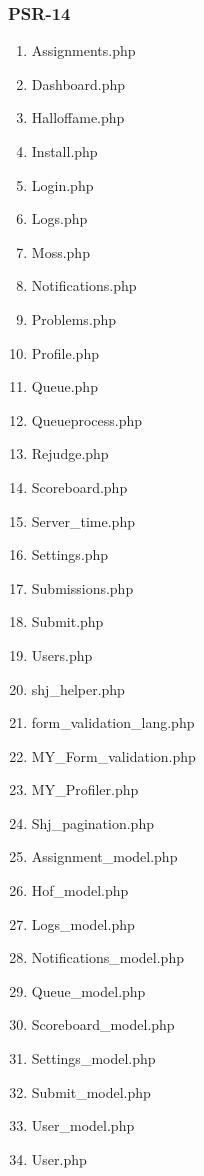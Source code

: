 \subsubsection{PSR-14}
\begin{enumerate}
	\item Assignments.php
	\item Dashboard.php
	\item Halloffame.php
	\item Install.php
	\item Login.php
	\item Logs.php
	\item Moss.php
	\item Notifications.php
	\item Problems.php
	\item Profile.php
	\item Queue.php
	\item Queueprocess.php
	\item Rejudge.php
	\item Scoreboard.php
	\item Server\_time.php
	\item Settings.php
	\item Submissions.php
	\item Submit.php
	\item Users.php
	\item shj\_helper.php
	\item form\_validation\_lang.php
	\item MY\_Form\_validation.php
	\item MY\_Profiler.php
	\item Shj\_pagination.php
	\item Assignment\_model.php
	\item Hof\_model.php
	\item Logs\_model.php
	\item Notifications\_model.php
	\item Queue\_model.php
	\item Scoreboard\_model.php
	\item Settings\_model.php
	\item Submit\_model.php
	\item User\_model.php
	\item User.php
\end{enumerate}


